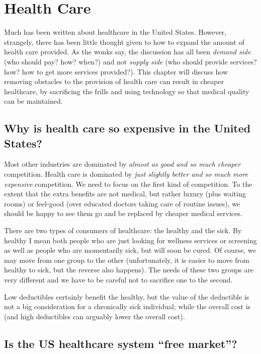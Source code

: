 \chapter{Health Care}
\label{chpt:health}

Much has been written about healthcare in the United States. However,
strangely, there has been little thought given to how to expand the amount of
health care provided. As the wonks say, the discussion has all been
\emph{demand side} (who should pay? how? when?) and not \emph{supply side} (who
should provide services? how? how to get more services provided?). This chapter
will discuss how removing obstacles to the provision of health care can result
in cheaper healthcare, by sacrificing the frills and using technology so that
medical quality can be maintained.

\section{Why is health care so expensive in the United States?}

Most other industries are dominated by \emph{almost as good and so much
cheaper} competition. Health care is dominated by \emph{just slightly better
and so much more expensive} competition. We need to focus on the first kind of
competition. To the extent that the extra benefits are not medical, but rather
luxury (plus waiting rooms) or feel-good (over educated doctors taking care of
routine issues), we should be happy to see them go and be replaced by cheaper
medical services.

There are two types of consumers of healthcare: the healthy and the sick. By
healthy I mean both people who are just looking for wellness services or
screening as well as people who are momentarily sick, but will soon be cured.
Of course, we may move from one group to the other (unfortunately, it is easier
to move from healthy to sick, but the reverse also happens). The needs of
these two groups are very different and we have to be careful not to sacrifice
one to the second.

Low deductibles certainly benefit the healthy, but the value of the deductible
is not a big consideration for a chronically sick individual; while the overall
cost is (and high deductibles can arguably lower the overall cost).

\section{Is the US healthcare system ``free market''?}

